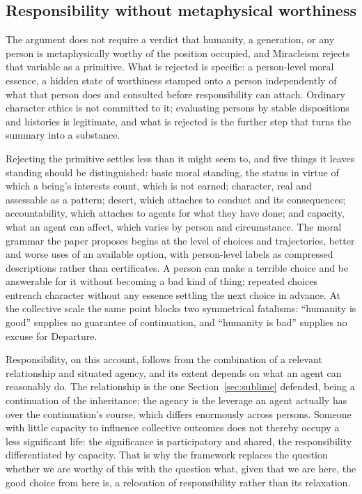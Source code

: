 \subsection*{Responsibility without metaphysical worthiness}

The argument does not require a verdict that humanity, a generation, or any
person is metaphysically worthy of the position occupied, and Miracleism
rejects that variable as a primitive. What is rejected is specific: a
person-level moral essence, a hidden state of worthiness stamped onto a
person independently of what that person does and consulted before
responsibility can attach. Ordinary character ethics is not committed to it;
evaluating persons by stable dispositions and histories is legitimate, and
what is rejected is the further step that turns the summary into a
substance.

Rejecting the primitive settles less than it might seem to, and five things it
leaves standing should be distinguished: basic moral standing, the status in
virtue of which a being's interests count, which is not earned; character,
real and assessable as a pattern; desert, which attaches to conduct and its
consequences; accountability, which attaches to agents for what they have
done; and capacity, what an agent can affect, which varies by person and
circumstance. The moral grammar the paper proposes begins at the level of
choices and trajectories, better and worse uses of an available option, with
person-level labels as compressed descriptions rather than certificates. A
person can make a terrible choice and be answerable for it without becoming a
bad kind of thing; repeated choices entrench character without any essence
settling the next choice in advance. At the collective scale the same point blocks two symmetrical
fatalisms: ``humanity is good'' supplies no guarantee of continuation, and
``humanity is bad'' supplies no excuse for Departure.

Responsibility, on this account, follows from the combination of a relevant
relationship and situated agency, and its extent depends on what an agent can
reasonably do. The relationship is the one Section~\ref{sec:sublime} defended,
being a continuation of the inheritance; the agency is the leverage an agent
actually has over the continuation's course, which differs enormously across
persons. Someone with little capacity to influence collective outcomes does
not thereby occupy a less significant life: the significance is participatory
and shared, the responsibility differentiated by capacity. That is why the
framework replaces the question whether we are worthy of this with the
question what, given that we are here, the good choice from here is, a
relocation of responsibility rather than its relaxation.

